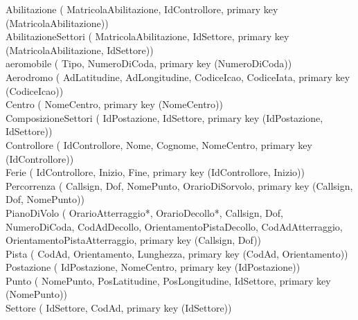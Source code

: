 Abilitazione (
     MatricolaAbilitazione,
     IdControllore,
     primary key (MatricolaAbilitazione))\\

AbilitazioneSettori (
     MatricolaAbilitazione,
     IdSettore,
     primary key (MatricolaAbilitazione, IdSettore))\\

aeromobile (
     Tipo,
     NumeroDiCoda,
     primary key (NumeroDiCoda))\\

Aerodromo (
     AdLatitudine,
     AdLongitudine,
     CodiceIcao,
     CodiceIata,
     primary key (CodiceIcao))\\

Centro (
     NomeCentro,
     primary key (NomeCentro))\\

ComposizioneSettori (
     IdPostazione,
     IdSettore,
     primary key (IdPostazione, IdSettore))\\

Controllore (
     IdControllore,
     Nome,
     Cognome,
     NomeCentro,
     primary key (IdControllore))\\

Ferie (
     IdControllore,
     Inizio,
     Fine,
     primary key (IdControllore, Inizio))\\

Percorrenza (
     Callsign,
     Dof,
     NomePunto,
     OrarioDiSorvolo,
     primary key (Callsign, Dof, NomePunto))\\

PianoDiVolo (
     OrarioAtterraggio*,
     OrarioDecollo*,
     Callsign,
     Dof,
     NumeroDiCoda,
     CodAdDecollo,
     OrientamentoPistaDecollo,
     CodAdAtterraggio,
     OrientamentoPistaAtterraggio,
     primary key (Callsign, Dof))\\

Pista (
     CodAd,
     Orientamento,
     Lunghezza,
     primary key (CodAd, Orientamento))\\

Postazione (
     IdPostazione,
     NomeCentro,
     primary key (IdPostazione))\\

Punto (
     NomePunto,
     PosLatitudine,
     PosLongitudine,
     IdSettore,
     primary key (NomePunto))\\

Settore (
     IdSettore,
     CodAd,
     primary key (IdSettore))\\

